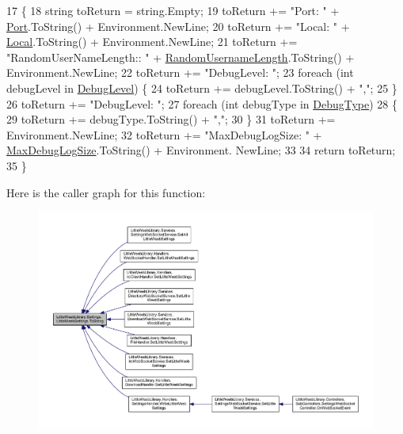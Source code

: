 \begin{DoxyCode}
17         \{
18             \textcolor{keywordtype}{string} toReturn = \textcolor{keywordtype}{string}.Empty;
19             toReturn += \textcolor{stringliteral}{"Port: "} + \mbox{\hyperlink{class_little_weeb_library_1_1_settings_1_1_little_weeb_settings_ab37db9696fb199dbdad39ea6c7eda76c}{Port}}.ToString() + Environment.NewLine;
20             toReturn += \textcolor{stringliteral}{"Local: "} + \mbox{\hyperlink{class_little_weeb_library_1_1_settings_1_1_little_weeb_settings_a01ccf2dfb1b01854f23b34f1eb7ac39c}{Local}}.ToString() + Environment.NewLine;
21             toReturn += \textcolor{stringliteral}{"RandomUserNameLength:: "} + \mbox{\hyperlink{class_little_weeb_library_1_1_settings_1_1_little_weeb_settings_a0826aad7341af901477ce991359129d4}{RandomUsernameLength}}.ToString() + 
      Environment.NewLine;
22             toReturn += \textcolor{stringliteral}{"DebugLevel: "};
23             \textcolor{keywordflow}{foreach} (\textcolor{keywordtype}{int} debugLevel \textcolor{keywordflow}{in} \mbox{\hyperlink{class_little_weeb_library_1_1_settings_1_1_little_weeb_settings_a22ae8b2dc7e6bb5e0b3b0220484c4c86}{DebugLevel}}) \{
24                 toReturn += debugLevel.ToString() + \textcolor{stringliteral}{","};
25             \}
26             toReturn += \textcolor{stringliteral}{"DebugLevel: "};
27             \textcolor{keywordflow}{foreach} (\textcolor{keywordtype}{int} debugType \textcolor{keywordflow}{in} \mbox{\hyperlink{class_little_weeb_library_1_1_settings_1_1_little_weeb_settings_a3e498a95757f135bc082566afbfa8877}{DebugType}})
28             \{
29                 toReturn += debugType.ToString() + \textcolor{stringliteral}{","};
30             \}
31             toReturn += Environment.NewLine;
32             toReturn += \textcolor{stringliteral}{"MaxDebugLogSize: "} + \mbox{\hyperlink{class_little_weeb_library_1_1_settings_1_1_little_weeb_settings_aed66354aaf455ab77c7360074cb05a2d}{MaxDebugLogSize}}.ToString() + Environment.
      NewLine;
33 
34             \textcolor{keywordflow}{return} toReturn;
35         \}
\end{DoxyCode}
Here is the caller graph for this function\+:\nopagebreak
\begin{figure}[H]
\begin{center}
\leavevmode
\includegraphics[width=350pt]{class_little_weeb_library_1_1_settings_1_1_little_weeb_settings_a5a5b722dd8e117be810022882795b6ae_icgraph}
\end{center}
\end{figure}



